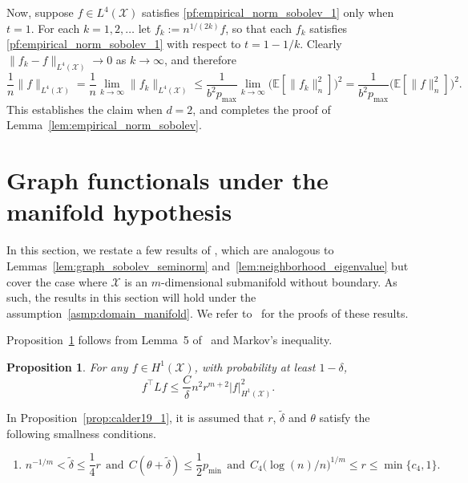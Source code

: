 \documentclass[twoside]{article}
\newcommand{\1}{\mathbf{1}}
\newcommand{\Xset}{\mathcal{X}}
\newcommand{\Leb}{L}
\newcommand{\wt}[1]{\widetilde{#1}}
\newtheorem{proposition}{Proposition}
\theoremstyle{definition}
\theoremstyle{remark}
\begin{document}
Now, suppose $f \in \Leb^4(\Xset)$ satisfies \eqref{pf:empirical_norm_sobolev_1} only when $t = 1$. For each $k = 1,2,\ldots$ let $f_k := n^{1/(2k)}f$, so that each $f_k$ satisfies \eqref{pf:empirical_norm_sobolev_1} with respect to $t = 1 - 1/k$. Clearly $\|f_k - f\|_{\Leb^4(\Xset)} \to 0$ as $k \to \infty$, and therefore
\begin{equation*}
\frac{1}{n}\|f\|_{\Leb^4(\Xset)} = \frac{1}{n}\lim_{k \to \infty} \|f_k\|_{\Leb^4(\Xset)} \leq \frac{1}{b^2p_{\max}} \lim_{k \to \infty} \bigl(\mathbb{E}[\|f_k\|_n^2]\bigr)^2 =  \frac{1}{b^2p_{\max}}\bigl(\mathbb{E}[\|f\|_n^2]\bigr)^2.
\end{equation*}
This establishes the claim when $d = 2$, and completes the proof of Lemma~\ref{lem:empirical_norm_sobolev}.

\section{Graph functionals under the manifold hypothesis}
\label{sec:manifold}

In this section, we restate a few results of \citet{trillos2019,calder2019}, which are analogous to Lemmas~\ref{lem:graph_sobolev_seminorm} and~\ref{lem:neighborhood_eigenvalue} but cover the case where $\Xset$ is an $m$-dimensional submanifold without boundary. As such, the results in this section will hold under the assumption~\ref{asmp:domain_manifold}. We refer to~\citet{trillos2019,calder2019} for the proofs of these results.

Proposition~\ref{prop:garciatrillos19_1} follows from Lemma~5 of~\citet{trillos2019} and Markov's inequality.
\begin{proposition}
	\label{prop:garciatrillos19_1}
	For any $f \in H^1(\Xset)$, with probability at least $1 - \delta$,
	\begin{equation*}
	f^{\top} L f \leq \frac{C}{\delta} n^2 r^{m + 2} |f|_{H^1(\Xset)}^2.
	\end{equation*}
\end{proposition}

In Proposition~\ref{prop:calder19_1}, it is assumed that $r$, $\wt{\delta}$ and $\theta$ satisfy the following smallness conditions.
\begin{enumerate}[label=(S\arabic*)]
	\item 
	\setcounter{enumi}{1}
	\begin{equation*}
	n^{-1/m} < \wt{\delta} \leq \frac{1}{4}r~~\textrm{and}~~C(\theta + \wt{\delta}) \leq \frac{1}{2}p_{\min}~~\textrm{and}~~C_4\bigl(\log(n)/n\bigr)^{1/m}\leq r \leq\min\{c_4,1\}.
	\end{equation*}
\end{enumerate}
\end{document}
